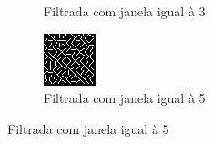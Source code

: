 \documentclass[10pt,a4paper]{article}
\begin{document}
\begin{figure}[!ht]
\begin{subfigure}[ht]{0.20\textwidth}
        \caption{Filtrada com janela igual à 3}
    \end{subfigure}
    \qquad
    \begin{subfigure}[ht]{0.20\textwidth}
        \includegraphics[width=\textwidth]{3_filtered_window_5.jpg}
        \caption{Filtrada com janela igual à 5}
    \end{subfigure}
\end{figure}
\end{document}
